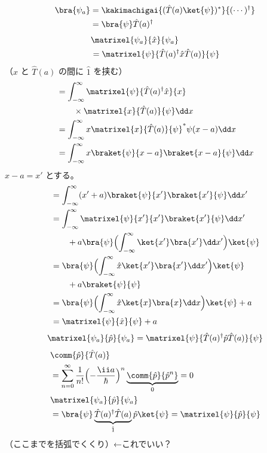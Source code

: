 \begin{align*}
\bra{\psi_{a}}&=\kakimachigai{(\hat{T}(a)\ket{\psi})^{*}}{(\cdots)^{\dagger}}\\
&=\bra{\psi}\hat{T}(a)^{\dagger}
\end{align*}
\begin{align*}
&\matrixel{\psi_{a}}{\hat{x}}{\psi_{a}}\\
&=\matrixel{\psi}{\hat{T}(a)^{\dagger}\hat{x}\hat{T}(a)}{\psi}
\end{align*}
（$\hat{x}$ と $\hat{T}(a)$ の間に $\hat{1}$ を挟む）
\begin{align*}
&=\int_{-\infty}^{\infty}\matrixel{\psi}{\hat{T}(a)^{\dagger}\hat{x}}{x}\\
&\qquad\times\matrixel{x}{\hat{T}(a)}{\psi}\dd x\\
&=\int_{-\infty}^{\infty}x\matrixel{x}{\hat{T}(a)}{\psi}^{*}\psi(x-a)\dd x\\
&=\int_{-\infty}^{\infty}x\braket{\psi}{x-a}\braket{x-a}{\psi}\dd x
\end{align*}
$x-a=x'$ とする。
\begin{align*}
&=\int_{-\infty}^{\infty}(x'+a)\braket{\psi}{x'}\braket{x'}{\psi}\dd x'\\
&=\int_{-\infty}^{\infty}\matrixel{\psi}{x'}{x'}\braket{x'}{\psi}\dd x'\\
&\qquad+a\bra{\psi}\Bigl(\int_{-\infty}^{\infty}\ket{x'}\bra{x'}\dd x'\Bigr)\ket{\psi}\\
&=\bra{\psi}\Bigl(\int_{-\infty}^{\infty}\hat{x}\ket{x'}\bra{x'}\dd x'\Bigr)\ket{\psi}\\
&\qquad+a\braket{\psi}{\psi}\\
&=\bra{\psi}\Bigl(\int_{-\infty}^{\infty}\hat{x}\ket{x}\bra{x}\dd x\Bigr)\ket{\psi}+a\\
&=\matrixel{\psi}{\hat{x}}{\psi}+a
\end{align*}
\[ \matrixel{\psi_{a}}{\hat{p}}{\psi_{a}}=\matrixel{\psi}{\hat{T}(a)^{\dagger}\hat{p}\hat{T}(a)}{\psi} \]
\begin{align*}
&\comm{\hat{p}}{\hat{T}(a)}\\
&=\sum_{n=0}^{\infty}\frac{1}{n!}\Bigl(-\frac{\ii a}{\hbar}\Bigr)^{n}\underbrace{\comm{\hat{p}}{\hat{p}^{n}}}_{0}=0\\
&\matrixel{\psi_{a}}{\hat{p}}{\psi_{a}}\\
&=\bra{\psi}\underbrace{\hat{T}(a)^{\dagger}\hat{T}(a)}_{\hat{1}}\hat{p}\ket{\psi}=\matrixel{\psi}{\hat{p}}{\psi}
\end{align*}
（ここまでを括弧でくくり）←これでいい？
